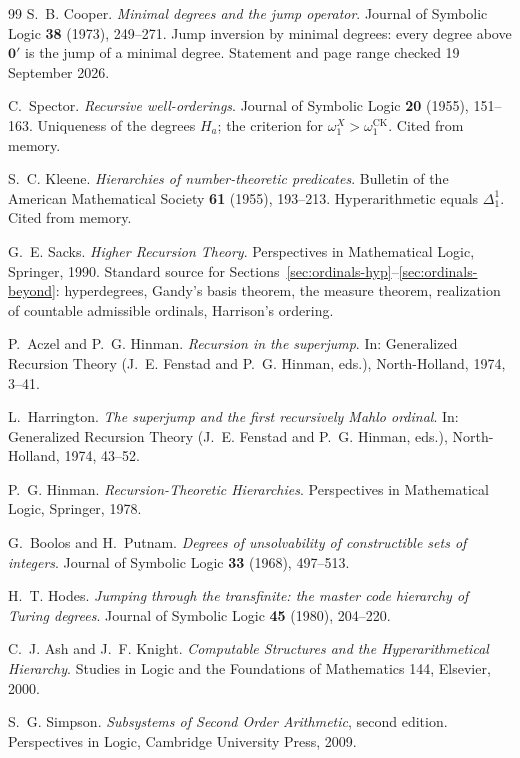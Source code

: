 \documentclass[11pt,a4paper]{article}
\newcommand{\zero}{\mathbf0}
\theoremstyle{definition}\newtheorem{definition}[theorem]{Definition}
\theoremstyle{remark}\newtheorem{remark}[theorem]{Remark}
\begin{document}
\begin{thebibliography}{99}
S.~B. Cooper.
\emph{Minimal degrees and the jump operator}.
Journal of Symbolic Logic \textbf{38} (1973), 249--271.
Jump inversion by minimal degrees: every degree above $\zero'$ is the jump of a minimal degree. Statement and page range checked 19 September 2026.

C.~Spector.
\emph{Recursive well-orderings}.
Journal of Symbolic Logic \textbf{20} (1955), 151--163.
Uniqueness of the degrees $H_a$; the criterion for $\omega_1^X>\omega_1^{\mathrm{CK}}$. Cited from memory.

S.~C. Kleene.
\emph{Hierarchies of number-theoretic predicates}.
Bulletin of the American Mathematical Society \textbf{61} (1955), 193--213.
Hyperarithmetic equals $\Delta^1_1$. Cited from memory.

G.~E. Sacks.
\emph{Higher Recursion Theory}.
Perspectives in Mathematical Logic, Springer, 1990.
Standard source for Sections~\ref{sec:ordinals-hyp}--\ref{sec:ordinals-beyond}: hyperdegrees, Gandy's basis theorem, the measure theorem, realization of countable admissible ordinals, Harrison's ordering.

P.~Aczel and P.~G. Hinman.
\emph{Recursion in the superjump}.
In: Generalized Recursion Theory (J.~E. Fenstad and P.~G. Hinman, eds.), North-Holland, 1974, 3--41.

L.~Harrington.
\emph{The superjump and the first recursively Mahlo ordinal}.
In: Generalized Recursion Theory (J.~E. Fenstad and P.~G. Hinman, eds.), North-Holland, 1974, 43--52.

P.~G. Hinman.
\emph{Recursion-Theoretic Hierarchies}.
Perspectives in Mathematical Logic, Springer, 1978.

G.~Boolos and H.~Putnam.
\emph{Degrees of unsolvability of constructible sets of integers}.
Journal of Symbolic Logic \textbf{33} (1968), 497--513.

H.~T. Hodes.
\emph{Jumping through the transfinite: the master code hierarchy of Turing degrees}.
Journal of Symbolic Logic \textbf{45} (1980), 204--220.

C.~J. Ash and J.~F. Knight.
\emph{Computable Structures and the Hyperarithmetical Hierarchy}.
Studies in Logic and the Foundations of Mathematics 144, Elsevier, 2000.

S.~G. Simpson.
\emph{Subsystems of Second Order Arithmetic}, second edition.
Perspectives in Logic, Cambridge University Press, 2009.


\end{thebibliography}
\end{document}
